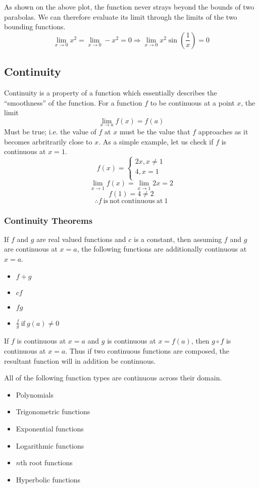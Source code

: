 \documentclass[12pt]{report}
\newcommand{\limit}{\lim\limits}
\begin{document}
\begin{flushleft}
As shown on the above plot, the function never strays beyond the bounds of
two parabolas. We can therefore evaluate its limit through the limits of the
two bounding functions.
\[\limit_{x\rightarrow0}x^2 = \limit_{x\rightarrow0} -x^2 = 0
\Rightarrow \limit_{x\rightarrow0} x^2\sin\left(\frac{1}{x}\right) = 0\]

\subsection*{Continuity}
Continuity is a property of a function which essentially describes the 
``smoothness'' of the function. For a function \(f\) to be continuous at a 
point \(x\), the limit
\[\limit_{x\rightarrow a}f(x) = f(a)\]
Must be true; i.e. the value of \(f\) at \(x\) must be the value that \(f\) 
approaches as it becomes arbritrarily close to \(x\). As a simple example, let
us check if \(f\) is continuous at \(x = 1\).
\[f(x) = 
    \begin{cases}
        2x, x \neq 1 \\
        4, x = 1 \\
    \end{cases}
\]
\[\limit_{x\rightarrow1} f(x) = \limit_{x\rightarrow1} 2x = 2\]
\[f(1) = 4 \neq 2\]
\[\therefore f \mathrm{\:is\:not\:continuous\:at\:}1\]

\subsubsection*{Continuity Theorems}
If \(f\) and \(g\) are real valued functions and \(c\) is a constant, then
assuming \(f\) and \(g\) are continuous at \(x = a\), the following functions
are additionally continuous at \(x = a\).
\begin{itemize}
    \item \(f + g\)
    \item \(cf\)
    \item \(fg\)
    \item \(\frac{f}{g} \mathrm{\:if\:} g(a) \neq 0\)
\end{itemize}
If \(f\) is continuous at \(x = a\) and \(g\) is continuous at \(x = f(a)\),
then \(g \circ f\) is continuous at \(x = a\). Thus if two continuous functions
are composed, the resultant function will in addition be continuous.

\bigskip
All of the following function types are continuous across their domain.
\begin{itemize}
    \item Polynomials
    \item Trigonometric functions
    \item Exponential functions
    \item Logarithmic functions
    \item \(n\)th root functions
    \item Hyperbolic functions
\end{itemize}


\end{flushleft}
\end{document}
